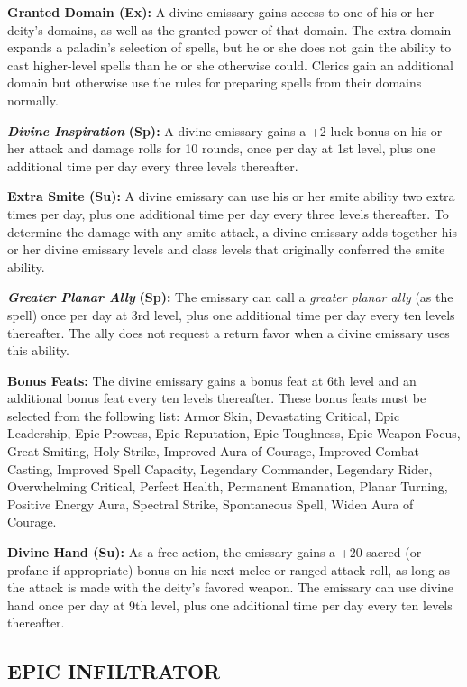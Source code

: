 \documentclass{article}
\begin{document}
\textbf{Granted Domain (Ex):} A divine emissary gains access to one of his or her 
deity's domains, as well as the granted power of that domain. The extra domain 
expands a paladin's selection of spells, but he or she does not gain the ability 
to cast higher-level spells than he or she otherwise could. Clerics gain an additional 
domain but otherwise use the rules for preparing spells from their domains normally. 

\textit{\textbf{Divine Inspiration }}\textbf{(Sp):} A divine emissary gains a +2 
luck bonus on his or her attack and damage rolls for 10 rounds, once per day at 
1st level, plus one additional time per day every three levels thereafter. 

\textbf{Extra Smite (Su):} A divine emissary can use his or her smite ability two 
extra times per day, plus one additional time per day every three levels thereafter. 
To determine the damage with any smite attack, a divine emissary adds together 
his or her divine emissary levels and class levels that originally conferred the 
smite ability. 

\textit{\textbf{Greater Planar Ally }}\textbf{(Sp):} The emissary can call a \textit{greater 
planar ally }(as the spell) once per day at 3rd level, plus one additional time 
per day every ten levels thereafter. The ally does not request a return favor when 
a divine emissary uses this ability. 

\textbf{Bonus Feats:} The divine emissary gains a bonus feat at 6th level and an 
additional bonus feat every ten levels thereafter. These bonus feats must be selected 
from the following list: Armor Skin, Devastating Critical, Epic Leadership, Epic 
Prowess, Epic Reputation, Epic Toughness, Epic Weapon Focus, Great Smiting, Holy 
Strike, Improved Aura of Courage, Improved Combat Casting, Improved Spell Capacity, 
Legendary Commander, Legendary Rider, Overwhelming Critical, Perfect Health, Permanent 
Emanation, Planar Turning, Positive Energy Aura, Spectral Strike, Spontaneous Spell, 
Widen Aura of Courage. 

\textbf{Divine Hand (Su):} As a free action, the emissary gains a +20 sacred (or 
profane if appropriate) bonus on his next melee or ranged attack roll, as long 
as the attack is made with the deity's favored weapon. The emissary can use divine 
hand once per day at 9th level, plus one additional time per day every ten levels 
thereafter.

\vspace{12pt}
\subsection*{{\LARGE{}EPIC INFILTRATOR }}
\end{document}
